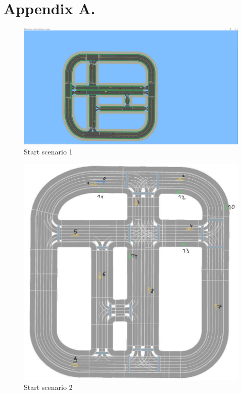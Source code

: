 \chapter{Appendix A.}


\begin{figure}[ht] 
	\label{figure:appednix:start_scenario_1}
	\includegraphics[width=1\linewidth]{simulations/start_scenarios/scenario_v2}
	\caption{Start scenario 1}
\end{figure}

\begin{figure}[ht] 
	\label{figure:appednix:start_scenario_2}
	\includegraphics[width=1\linewidth]{simulations/start_scenarios/scenario_v3}
	\caption{Start scenario 2}
\end{figure}

